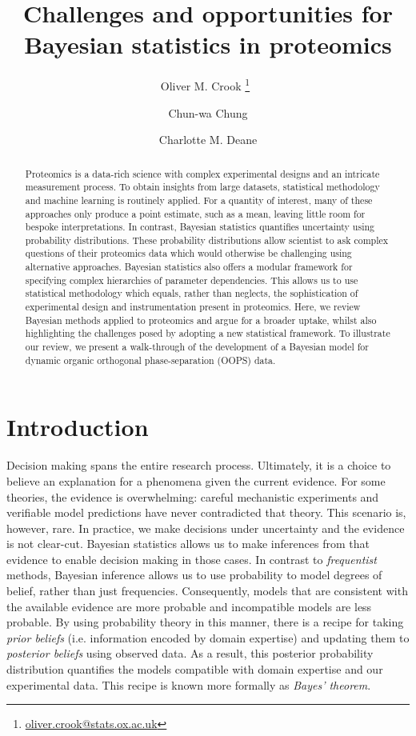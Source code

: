 \documentclass[12pt,english]{article}
\title{Challenges and opportunities for Bayesian statistics in proteomics}
\author[1]{Oliver M. Crook \thanks{\url{oliver.crook@stats.ox.ac.uk}}~}
\author[2]{Chun-wa Chung}
\author[1]{Charlotte M. Deane}
\affil[1]{Department of Statistics, University of Oxford, Oxford, UK}
\affil[2]{Structural and Biophysical Sciences, GlaxoSmithKline R\&D, Stevenage, UK}
\begin{document}
\maketitle
\begin{abstract}
Proteomics is a data-rich science with complex experimental designs and an intricate measurement process. To obtain insights from large datasets, statistical methodology and machine learning is routinely applied. For a quantity of interest, many of these approaches only produce a point estimate, such as a mean, leaving little room for bespoke interpretations. In contrast, Bayesian statistics quantifies uncertainty using probability distributions. These probability distributions allow scientist to ask complex questions of their proteomics data which would otherwise be challenging using alternative approaches. Bayesian statistics also offers a modular framework for specifying complex hierarchies of parameter dependencies. This allows us to use statistical methodology which equals, rather than neglects, the sophistication of experimental design and instrumentation present in proteomics. Here, we review Bayesian methods applied to proteomics and argue for a broader uptake, whilst also highlighting the challenges posed by adopting a new statistical framework. To illustrate our review, we present a walk-through of the development of a Bayesian model for dynamic organic orthogonal phase-separation (OOPS) data.      
\end{abstract}
\section{Introduction}
Decision making spans the entire research process. Ultimately, it is a choice to believe an explanation for a phenomena given the current evidence. For some theories, the evidence is overwhelming: careful mechanistic experiments and verifiable model predictions have never contradicted that theory. This scenario is, however, rare. In practice, we make decisions under uncertainty and the evidence is not clear-cut. Bayesian statistics allows us to make inferences from that evidence to enable decision making in those cases. In contrast to \textit{frequentist} methods, Bayesian inference allows us to use probability to model degrees of belief, rather than just frequencies. Consequently, models that are consistent with the available evidence are more probable and incompatible models are less probable. By using probability theory in this manner, there is a recipe for taking \textit{prior beliefs} (i.e. information encoded by domain expertise) and updating them to \textit{posterior beliefs} using observed data. As a result, this posterior probability distribution quantifies the models compatible with domain expertise and our experimental data. This recipe is known more formally as \textit{Bayes' theorem}. 
\end{document}
